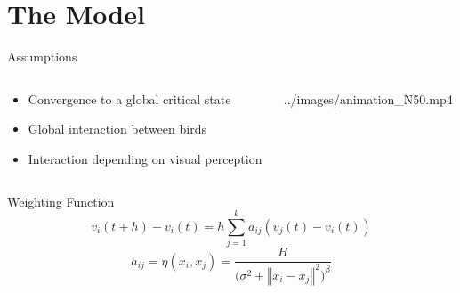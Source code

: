 \documentclass{beamer}
\begin{document}
\section{The Model}
\begin{frame}{Assumptions}
	\begin{minipage}[0.95\textheight]{\textwidth}
	\begin{columns}[T]
	\begin{column}{0.40\textwidth}
		\begin{itemize}
		\item Convergence to a global critical state
		\vspace{0.5cm}
		\item Global interaction between birds
		\vspace{0.5cm}
		\item Interaction depending on visual perception
		\end{itemize}
	\end{column}
	\begin{column}{0.50\textwidth}
		{../images/animation_N50.mp4}
	\end{column}
	\end{columns}
	\end{minipage}
\end{frame}
\begin{frame}{Weighting Function}
	\begin{equation}
		v_i(t+h)-v_i(t)=h\sum_{j=1}^k a_{ij}(v_j(t)-v_i(t))\nonumber
	\end{equation}
  \vspace{1cm}
	\begin{equation}
		a_{ij}=\eta(x_i,x_j)=\frac{H}{\big(\sigma^2+\left\Vert x_i - x_j \right\Vert^2\big)^{\beta}}\nonumber
	\end{equation}
\end{frame}
\end{document}
